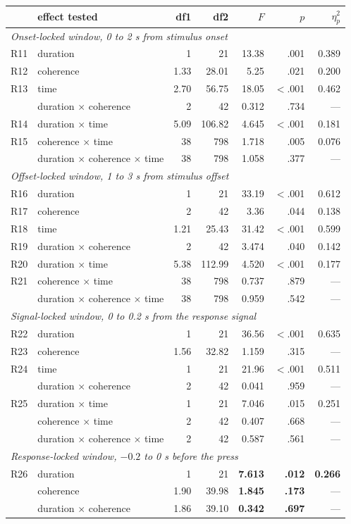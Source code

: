 \begin{center}\small
\begin{tabular}{llrrrrr}
\toprule
& effect tested & df1 & df2 & $F$ & $p$ & $\eta_p^2$\\
\midrule
\multicolumn{7}{l}{\emph{Onset-locked window, 0 to 2 s from stimulus onset}}\\
R11 & duration & 1 & 21 & 13.38 & .001 & 0.389\\
R12 & coherence & 1.33 & 28.01 & 5.25 & .021 & 0.200\\
R13 & time & 2.70 & 56.75 & 18.05 & $<$.001 & 0.462\\
& duration $\times$ coherence & 2 & 42 & 0.312 & .734 & ---\\
R14 & duration $\times$ time & 5.09 & 106.82 & 4.645 & $<$.001 & 0.181\\
R15 & coherence $\times$ time & 38 & 798 & 1.718 & .005 & 0.076\\
& duration $\times$ coherence $\times$ time & 38 & 798 & 1.058 & .377 & ---\\
\midrule
\multicolumn{7}{l}{\emph{Offset-locked window, 1 to 3 s from stimulus offset}}\\
R16 & duration & 1 & 21 & 33.19 & $<$.001 & 0.612\\
R17 & coherence & 2 & 42 & 3.36 & .044 & 0.138\\
R18 & time & 1.21 & 25.43 & 31.42 & $<$.001 & 0.599\\
R19 & duration $\times$ coherence & 2 & 42 & 3.474 & .040 & 0.142\\
R20 & duration $\times$ time & 5.38 & 112.99 & 4.520 & $<$.001 & 0.177\\
R21 & coherence $\times$ time & 38 & 798 & 0.737 & .879 & ---\\
& duration $\times$ coherence $\times$ time & 38 & 798 & 0.959 & .542 & ---\\
\midrule
\multicolumn{7}{l}{\emph{Signal-locked window, 0 to 0.2 s from the response signal}}\\
R22 & duration & 1 & 21 & 36.56 & $<$.001 & 0.635\\
R23 & coherence & 1.56 & 32.82 & 1.159 & .315 & ---\\
R24 & time & 1 & 21 & 21.96 & $<$.001 & 0.511\\
& duration $\times$ coherence & 2 & 42 & 0.041 & .959 & ---\\
R25 & duration $\times$ time & 1 & 21 & 7.046 & .015 & 0.251\\
& coherence $\times$ time & 2 & 42 & 0.407 & .668 & ---\\
& duration $\times$ coherence $\times$ time & 2 & 42 & 0.587 & .561 & ---\\
\midrule
\multicolumn{7}{l}{\emph{Response-locked window, $-0.2$ to 0 s before the press}}\\
R26 & duration & 1 & 21 & \textbf{7.613} & \textbf{.012} & \textbf{0.266}\\
& coherence & 1.90 & 39.98 & \textbf{1.845} & \textbf{.173} & ---\\
& duration $\times$ coherence & 1.86 & 39.10 & \textbf{0.342} & \textbf{.697} & ---\\
\bottomrule
\end{tabular}
\end{center}

